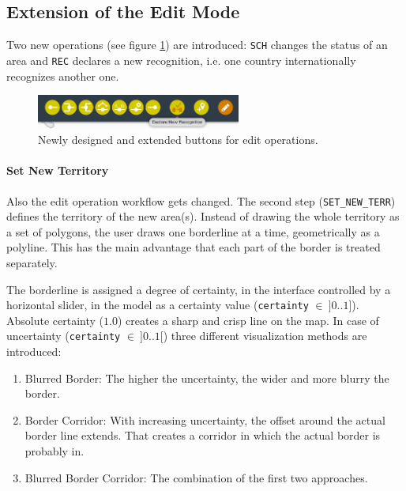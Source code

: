 \subsection{Extension of the Edit Mode} %
\label{sub:extension_of_the_edit_mode}

Two new operations (see figure \ref{fig:edit_mode_extension}) are introduced: \texttt{SCH} changes the status of an area and \texttt{REC} declares a new recognition, i.e. one country internationally recognizes another one.

\begin{figure}[ht]
  \centering
  \includegraphics[width = 0.6\textwidth]{graphics/uncertainty/edit_mode_extension.png}
  \caption{Newly designed and extended buttons for edit operations.}
  \label{fig:edit_mode_extension}
\end{figure}


\paragraph{Set New Territory} %
\label{par:set_new_territory}

Also the edit operation workflow gets changed. The second step (\texttt{SET\_NEW\_TERR}) defines the territory of the new area(s). Instead of drawing the whole territory as a set of polygons, the user draws one borderline at a time, geometrically as a polyline. This has the main advantage that each part of the border is treated separately.

The borderline is assigned a degree of certainty, in the interface controlled by a horizontal slider, in the model as a certainty value (\texttt{certainty} $\in~]0 .. 1]$). Absolute certainty ($1.0$) creates a sharp and crisp line on the map. In case of uncertainty (\texttt{certainty} $\in~]0..1[$) three different visualization methods are introduced:

\begin{enumerate}
  \item Blurred Border: The higher the uncertainty, the wider and more blurry the border.
  \item Border Corridor: With increasing uncertainty, the offset around the actual border line extends. That creates a corridor in which the actual border is probably in.
  \item Blurred Border Corridor: The combination of the first two approaches.
\end{enumerate}

